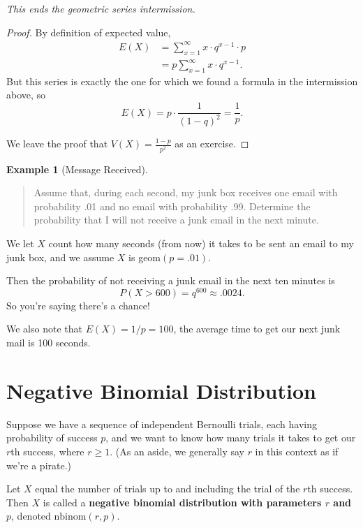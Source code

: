 \documentclass[
]{book}
\theoremstyle{definition}
\theoremstyle{definition}
\newtheorem{example}{Example}[chapter]
\theoremstyle{definition}
\theoremstyle{definition}
\theoremstyle{remark}
\begin{document}
\emph{This ends the geometric series intermission.}

\begin{proof}
By definition of expected value,
\begin{align*}
E(X) &= \sum_{x=1}^\infty x \cdot q^{x-1}\cdot p \\
&= p \sum_{x=1}^\infty x \cdot q^{x-1}.
\end{align*}
But this series is exactly the one for which we found a formula in the intermission above, so \[E(X) = p \cdot \frac{1}{(1-q)^2} = \frac{1}{p}.\]

We leave the proof that \(V(X) = \frac{1-p}{p^2}\) as an exercise.
\end{proof}

\begin{example}[Message Received]
\leavevmode

\begin{quote}
Assume that, during each second, my junk box receives one email with probability .01 and no email with probability .99. Determine the probability that I will not receive a junk email in the next minute.
\end{quote}

We let \(X\) count how many seconds (from now) it takes to be sent an email to my junk box, and we assume \(X\) is geom\((p = .01)\).

Then the probability of not receiving a junk email in the next ten minutes is \[P(X > 600) = q^{600} \approx .0024.\]
So you're saying there's a chance!

We also note that \(E(X) = 1/p = 100\), the average time to get our next junk mail is 100 seconds.

\end{example}

\section{Negative Binomial Distribution}\label{negative-binomial}

Suppose we have a sequence of independent Bernoulli trials, each having probability of success \(p\), and we want to know how many trials it takes to get our \(r\)th success, where \(r \geq 1\). (As an aside, we generally say \(r\) in this context as if we're a pirate.)

Let \(X\) equal the number of trials up to and including the trial of the \(r\)th success. Then \(X\) is called a \textbf{negative binomial distribution with parameters \(r\) and \(p\)}, denoted \(\text{nbinom}(r,p)\).
\end{document}
